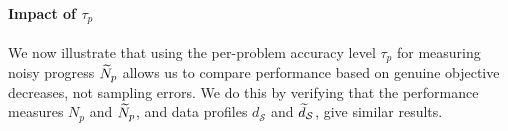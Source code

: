 

\paragraph{Impact of $\tau_p$}
We now illustrate that using the per-problem accuracy level $\tau_p$ for measuring noisy progress $\widetilde{N}_p$ allows us to compare performance based on genuine objective decreases, not sampling errors.
We do this by verifying that the performance measures $N_p$ and $\widetilde{N}_p$, and data profiles $d_{\mathcal{S}}$ and $\widetilde{d}_{\mathcal{S}}$, give similar results.

